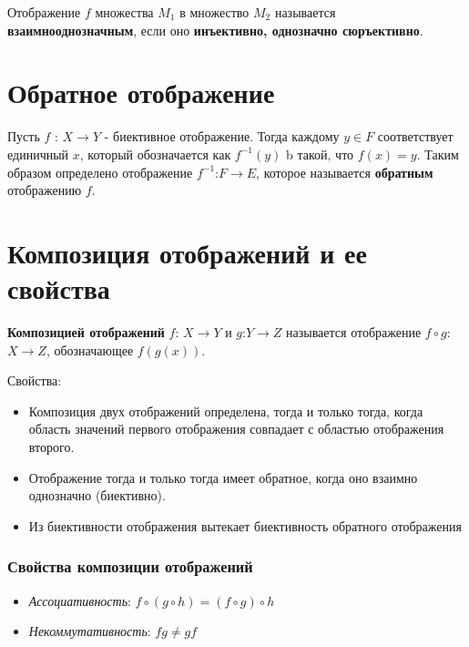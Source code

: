 \documentclass[a4paper]{article}
\begin{document}
{\begin{small}
Отображение $f$ множества $M_1$ в множество $M_2$ называется
\textbf{взаимнооднозначным}, если оно \textbf{инъективно, однозначно сюръективно}.

\section*{Обратное отображение
}
Пусть $f$ : $X \rightarrow Y$ - биективное отображение. Тогда каждому $y \in F$ соответствует единичный $x$, который обозначается как $f^{-1} (y)$ b такой, что $f(x) = y$. Таким образом определено отображение $f^{-1}$:$F \rightarrow E$, которое называется \textbf{обратным} отображению $f$.

\section*{Композиция отображений и ее свойства}
\textbf{Композицией отображений} $f$: $X \rightarrow Y$ и $g$:$Y \rightarrow Z$ называется отображение $f \circ g$: $X \rightarrow Z$, обозначающее $f(g(x))$.

Свойства:
\begin{itemize}
\item Композиция двух отображений определена, тогда и только тогда, когда область значений первого отображения совпадает с областью отображения второго.
\item Отображение тогда и только тогда
имеет обратное, когда оно взаимно однозначно (биективно).
\item Из биективности отображения вытекает биективность обратного отображения
\end{itemize}


\subsubsection*{Свойства композиции отображений}

\begin{itemize}
\item \textit{Ассоциативность}: $f \circ (g \circ h) = (f \circ g) \circ h$
\item \textit{Некоммутативность}: $fg \neq gf$

\end{itemize}


\end{small}}
\end{document}
